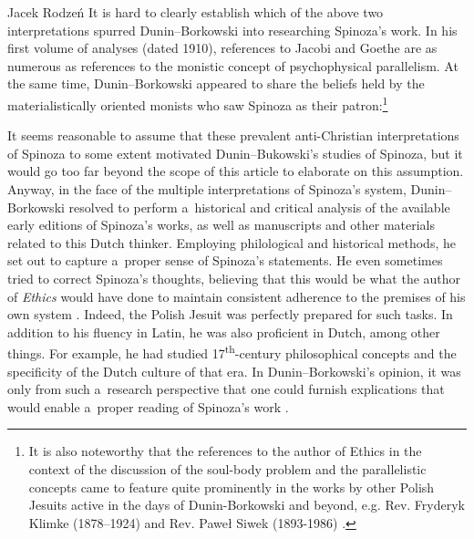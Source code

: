 \begin{artengenv}{Jacek Rodzeń}
It is hard to clearly establish which of the above two interpretations spurred Dunin–Borkowski into researching Spinoza's work. In his first volume of analyses (dated 1910), references to Jacobi and Goethe are as numerous as references to the monistic concept of psychophysical parallelism. At the same time, Dunin–Borkowski appeared to share the beliefs held by the materialistically oriented monists who saw Spinoza as their patron:\footnote{It is also noteworthy that the references to the author of Ethics in the context of the discussion of the soul-body problem and the parallelistic concepts came to feature quite prominently in the works by other Polish Jesuits active in the days of Dunin-Borkowski and beyond, e.g. Rev. Fryderyk Klimke (1878–1924) and Rev. Paweł Siwek (1893-1986)
\parencites*[cf.][pp.6]{klimke_teorya_1906}[][pp.312–332]{klimke_monismus_1911}[][pp.1310–1314]{bremer_philosophy_2020}.%
}


It seems reasonable to assume that these prevalent anti-Christian interpretations of Spinoza to some extent motivated Dunin–Bukowski's studies of Spinoza, but it would go too far beyond the scope of this article to elaborate on this assumption. Anyway, in the face of the multiple interpretations of Spinoza's system, Dunin–Borkowski resolved to perform a~historical and critical analysis of the available early editions of Spinoza's works, as well as manuscripts and other materials related to this Dutch thinker. Employing philological and historical methods, he set out to capture a~proper sense of Spinoza's statements. He even sometimes tried to correct Spinoza's thoughts, believing that this would be what the author of \textit{Ethics} would have done to maintain consistent adherence to the premises of his own system
\parencite[][p.308]{siwek_spinoza_1938}. %
 Indeed, the Polish Jesuit was perfectly prepared for such tasks. In addition to his fluency in Latin, he was also proficient in Dutch, among other things. For example, he had studied 17\textsuperscript{th}-century philosophical concepts and the specificity of the Dutch culture of that era. In Dunin–Borkowski's opinion, it was only from such a~research perspective that one could furnish explications that would enable a~proper reading of Spinoza's work 
\parencite[][p.XI–XXIII]{dunin-borkowski_junge_1910}.%



\end{artengenv}
